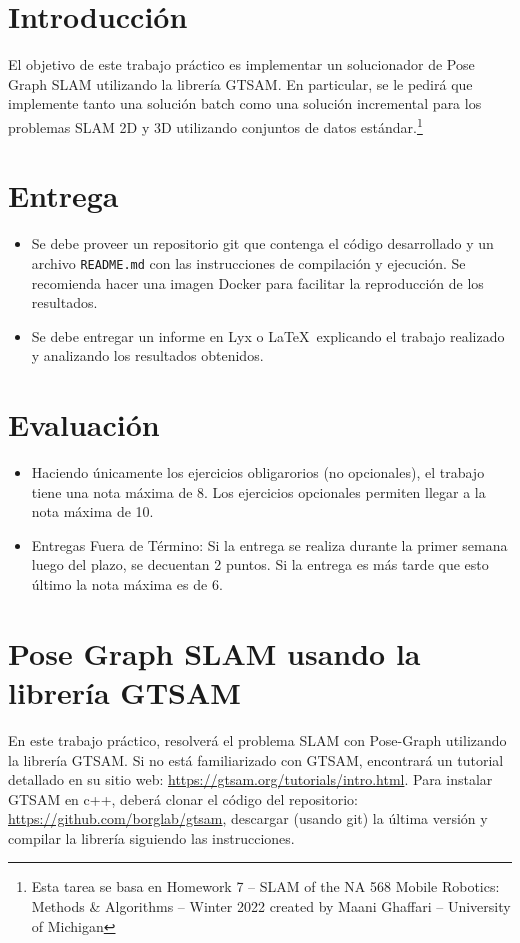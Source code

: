 \documentclass[tp]{lcc}
\begin{document}
\maketitle


\section{Introducción}
El objetivo de este trabajo práctico es implementar un solucionador de Pose Graph SLAM utilizando la librería GTSAM. En particular, se le pedirá que implemente tanto una solución batch como una solución incremental para los problemas SLAM 2D y 3D utilizando conjuntos de datos estándar.\footnote{Esta tarea se basa en Homework 7 -- SLAM of the NA 568 Mobile Robotics: Methods \& Algorithms -- Winter 2022 created by Maani Ghaffari -- University of Michigan}

\section*{Entrega}
	\begin{itemize}
        \item Se debe proveer un repositorio git que contenga el código desarrollado y un archivo \lstinline{README.md} con las instrucciones de compilación y ejecución. Se recomienda hacer una imagen Docker para facilitar la reproducción de los resultados.

        \item Se debe entregar un informe en Lyx o \LaTeX\  explicando el trabajo realizado y analizando los resultados obtenidos.
	\end{itemize}

\section*{Evaluación}
	\begin{itemize}
        \item Haciendo únicamente los ejercicios obligarorios (no opcionales), el trabajo tiene una nota máxima de 8. Los ejercicios opcionales permiten llegar a la nota máxima de 10.

        \item Entregas Fuera de Término: Si la entrega se realiza durante la primer semana luego del plazo, se decuentan 2 puntos. Si la entrega es más tarde que esto último la nota máxima es de 6.
	\end{itemize}

\section*{Pose Graph SLAM usando la librería GTSAM}
%
En este trabajo práctico, resolverá el problema SLAM con Pose-Graph utilizando la librería GTSAM. Si no está familiarizado con GTSAM, encontrará un tutorial detallado en su sitio web: \url{https://gtsam.org/tutorials/intro.html}. Para instalar GTSAM en c++, deberá clonar el código del repositorio: \url{https://github.com/borglab/gtsam}, descargar (usando git) la última versión y compilar la librería siguiendo las instrucciones.
\end{document}

